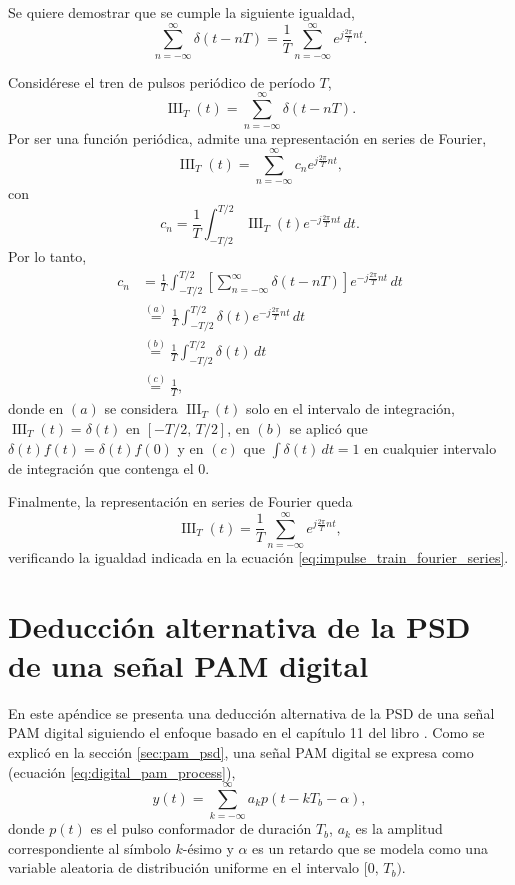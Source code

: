 \documentclass[a4paper]{article}
\begin{document}
Se quiere demostrar que se cumple la siguiente igualdad,
\begin{equation}\label{eq:impulse_train_fourier_series}
\sum_{n=-\infty}^{\infty}\delta(t-nT)=\frac{1}{T}\sum_{n=-\infty}^{\infty}e^{j\frac{2\pi}{T}nt}.
\end{equation}

Considérese el tren de pulsos periódico de período \(T\),
\[
 \operatorname{III}_T(t)=\sum_{n=-\infty}^{\infty}\delta(t-nT).
\]
Por ser una función periódica, admite una representación en series de Fourier,
\[
 \operatorname{III}_T(t)=\sum_{n=-\infty}^{\infty}c_ne^{j\frac{2\pi}{T} nt},
\]
con
\[
 c_n=\frac{1}{T}\int_{-T/2}^{T/2} \operatorname{III}_T(t)e^{-j\frac{2\pi}{T}nt}\,dt.
\]
Por lo tanto,
\begin{align*}
 c_n&=\frac{1}{T}\int_{-T/2}^{T/2}\left[\sum_{n=-\infty}^{\infty}\delta(t-nT)\right]e^{-j\frac{2\pi}{T}nt}\,dt\\
   &\overset{(a)}{=}\frac{1}{T}\int_{-T/2}^{T/2}\delta(t)e^{-j\frac{2\pi}{T}nt}\,dt\\
   &\overset{(b)}{=}\frac{1}{T}\int_{-T/2}^{T/2}\delta(t)\,dt\\
   &\overset{(c)}{=}\frac{1}{T},
\end{align*}
donde en \((a)\) se considera \(\operatorname{III}_T(t)\) solo en el intervalo de integración, \(\operatorname{III}_T(t)=\delta(t)\) en \([-T/2,\,T/2]\), en \((b)\) se aplicó que \(\delta(t)f(t)=\delta(t)f(0)\) y en \((c)\) que \(\int\delta(t)\,dt=1\) en cualquier intervalo de integración que contenga el 0.

Finalmente, la representación en series de Fourier queda
\[
 \operatorname{III}_T(t)=\frac{1}{T}\sum_{n=-\infty}^{\infty}e^{j\frac{2\pi}{T} nt},
\]
verificando la igualdad indicada en la ecuación \ref{eq:impulse_train_fourier_series}.
 
\section{Deducción alternativa de la PSD de una señal PAM digital}

En este apéndice se presenta una deducción alternativa de la PSD de una señal PAM digital siguiendo el enfoque  basado en el capítulo 11 del libro \cite{Carlson2009}. Como se explicó en la sección \ref{sec:pam_psd}, una señal PAM digital se expresa como (ecuación \ref{eq:digital_pam_process}),
\[
y(t)= \sum_{k=-\infty}^{\infty}a_kp(t-kT_b-\alpha),
\]
donde \(p(t)\) es el pulso conformador de duración \(T_b\), \(a_k\) es la amplitud correspondiente al símbolo \(k\)-ésimo y \(\alpha\) es un retardo que se modela como una variable aleatoria de distribución uniforme en el intervalo \([0,\, T_b)\).
\end{document}
